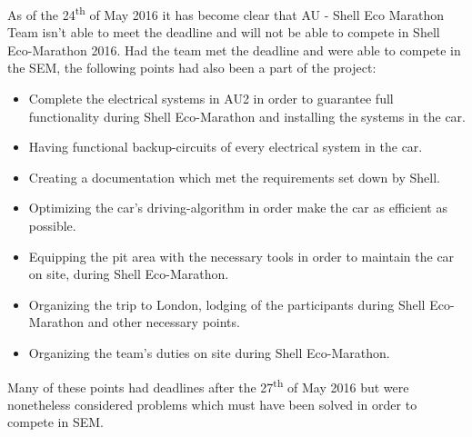 As of the 24\textsuperscript{th} of May 2016 it has become clear that AU - Shell Eco Marathon Team isn't able to meet the deadline and will not be able to compete in Shell Eco-Marathon 2016. Had the team met the deadline and were able to compete in the SEM, the following points had also been a part of the project:
\begin{itemize}
	\item Complete the electrical systems in AU2 in order to guarantee full functionality during Shell Eco-Marathon and installing the systems in the car.
	\item Having functional backup-circuits of every electrical system in the car.
	\item Creating a documentation which met the requirements set down by Shell.
	\item Optimizing the car's driving-algorithm in order make the car as efficient as possible.
	\item Equipping the pit area with the necessary tools in order to maintain the car on site, during Shell Eco-Marathon.
	\item Organizing the trip to London, lodging of the participants during Shell Eco-Marathon and other necessary points.
	\item Organizing the team's duties on site during Shell Eco-Marathon.
\end{itemize}
Many of these points had deadlines after the 27\textsuperscript{th} of May 2016 but were nonetheless considered problems which must have been solved in order to compete in SEM.